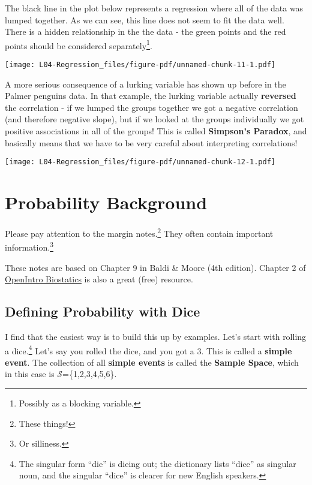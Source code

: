 \documentclass[
  letterpaper,
  DIV=11,
  numbers=noendperiod]{scrreprt}
\begin{document}
The black line in the plot below represents a regression where all of
the data was lumped together. As we can see, this line does not seem to
fit the data well. There is a hidden relationship in the the data - the
green points and the red points should be considered
separately\footnote{Possibly as a blocking variable.}.

\texttt{[image: L04-Regression\_files/figure-pdf/unnamed-chunk-11-1.pdf]}

A more serious consequence of a lurking variable has shown up before in
the Palmer penguins data. In that example, the lurking variable actually
\textbf{reversed} the correlation - if we lumped the groups together we
got a negative correlation (and therefore negative slope), but if we
looked at the groups individually we got positive associations in all of
the groups! This is called \textbf{Simpson's Paradox}, and basically
means that we have to be very careful about interpreting correlations!

\texttt{[image: L04-Regression\_files/figure-pdf/unnamed-chunk-12-1.pdf]}

\hypertarget{probability-background}{%
\chapter{Probability Background}\label{probability-background}}

Please pay attention to the margin notes.\footnote{These things!} They
often contain important information.\footnote{Or silliness.}

These notes are based on Chapter 9 in Baldi \& Moore (4th edition).
Chapter 2 of \href{https://www.openintro.org/book/biostat}{OpenIntro
Biostatics} is also a great (free) resource.

\hypertarget{defining-probability-with-dice}{%
\section{Defining Probability with
Dice}\label{defining-probability-with-dice}}

I find that the easiest way is to build this up by examples. Let's start
with rolling a dice.\footnote{The singular form ``die'' is dieing out;
  the dictionary lists ``dice'' as singular noun, and the singular
  ``dice'' is clearer for new English speakers.} Let's say you rolled
the dice, and you got a 3. This is called a \textbf{simple event}. The
collection of all \textbf{simple events} is called the \textbf{Sample
Space}, which in this case is \(\mathcal S\)=\{1,2,3,4,5,6\}.
\end{document}
